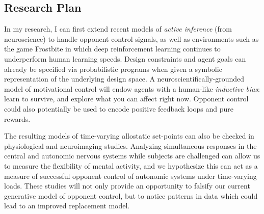 
\subsection*{Research Plan}
\begin{singlespace}
In my research, I can first extend recent models of \emph{active inference} (from
neuroscience) to handle opponent control signals, as well as environments such as
the game Frostbite in which deep reinforcement learning continues to underperform
human learning speeds\cite{Cullen2018,Lake2016}.  Design constraints and agent goals
can already be specified via probabilistic programs when given a symbolic
representation of the underlying design
space\cite{botvinick2012planning,Yeh:2012:SOW:2185520.2185552,Ritchie:2015:CPM:2809654.2766895}.
A neuroscientifically-grounded model of motivational control will endow agents with
a human-like \emph{inductive bias}: learn to survive, and explore what you can
affect right now.  Opponent control could also potentially be used to encode positive
feedback loops and pure rewards.
\end{singlespace}

\begin{singlespace}
The resulting models of time-varying allostatic set-points can also be checked in
physiological and neuroimaging studies.  Analyzing simultaneous responses in the
central and autonomic nervous systems while subjects are challenged can allow us
to measure the flexibility of mental activity, and we hypothesize this can act as
a measure of successful opponent control of autonomic systems under time-varying loads.
These studies will not only provide an opportunity to falsify our current generative
model of opponent control, but to notice patterns in data which could lead to an
improved replacement model.
\end{singlespace}

